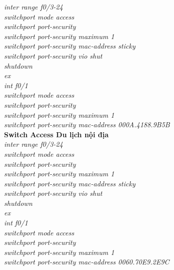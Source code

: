 \documentclass[a4paper, 12pt]{article}
\begin{document}
\hspace*{2cm}\textit{inter range f0/3-24\\
\hspace*{2cm}switchport mode access\\
\hspace*{2cm}switchport port-security\\
\hspace*{2cm}switchport port-security maximum 1\\
\hspace*{2cm}switchport port-security mac-address sticky\\
\hspace*{2cm}switchport port-security vio shut\\
\hspace*{2cm}shutdown\\
\hspace*{2cm}ex\\
\hspace*{2cm}int f0/1\\
\hspace*{2cm}switchport mode access\\
\hspace*{2cm}switchport port-security\\
\hspace*{2cm}switchport port-security maximum 1\\
\hspace*{2cm}switchport port-security mac-address 000A.4188.9B5B\\}
\hspace*{1cm}\textbf{Switch Access Du lịch nội địa}\\
\hspace*{2cm}\textit{inter range f0/3-24\\
\hspace*{2cm}switchport mode access\\
\hspace*{2cm}switchport port-security\\
\hspace*{2cm}switchport port-security maximum 1\\
\hspace*{2cm}switchport port-security mac-address sticky\\
\hspace*{2cm}switchport port-security vio shut\\
\hspace*{2cm}shutdown\\
\hspace*{2cm}ex\\
\hspace*{2cm}int f0/1\\
\hspace*{2cm}switchport mode access\\
\hspace*{2cm}switchport port-security\\
\hspace*{2cm}switchport port-security maximum 1\\
\hspace*{2cm}switchport port-security mac-address 0060.70E9.2E9C\\}
\end{document}
